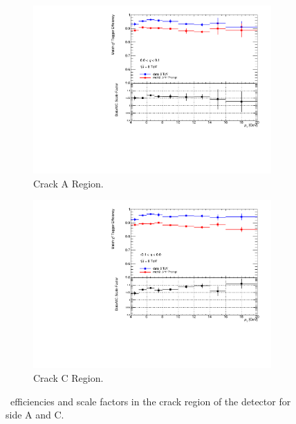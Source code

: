 \begin{figure}[htbp]
  \centering
  \begin{subfigure}[b]{0.85\textwidth}
    \includegraphics[width=\textwidth]{PartCalibration2012/Plots/SFPlots/Crack_A_smt.pdf}
    \caption{Crack A Region.} \label{fig:CalibrationScaleFactorCrackA}
  \end{subfigure}
  
  \begin{subfigure}[b]{0.85\textwidth}
    \includegraphics[width=\textwidth]{PartCalibration2012/Plots/SFPlots/Crack_C_smt.pdf}
    \caption{Crack C Region.} \label{fig:CalibrationScaleFactorCrackC}
  \end{subfigure}
  \caption{\xsm\ efficiencies and scale factors in the crack region of the detector for side  A and  C.} \label{fig:CalibrationScaleFactorCrack}
\end{figure}

